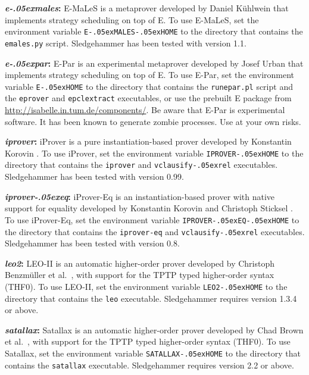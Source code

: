 \documentclass[a4paper,12pt]{article}
\newcommand\download{\url{http://isabelle.in.tum.de/components/}}
\renewcommand\_{\hbox{\textunderscore\kern-.05ex}}
\begin{document}
\begin{enum}
\begin{sloppy}
\begin{enum}
\item[\labelitemi] \textbf{\textit{e\_males}:} E-MaLeS is a metaprover developed
by Daniel K\"uhlwein that implements strategy scheduling on top of E. To use
E-MaLeS, set the environment variable \texttt{E\_MALES\_HOME} to the directory
that contains the \texttt{emales.py} script. Sledgehammer has been tested with
version 1.1.

\item[\labelitemi] \textbf{\textit{e\_par}:} E-Par is an experimental metaprover
developed by Josef Urban that implements strategy scheduling on top of E. To use
E-Par, set the environment variable \texttt{E\_HOME} to the directory that
contains the \texttt{runepar.pl} script and the \texttt{eprover} and
\texttt{epclextract} executables, or use the prebuilt E package from \download.
Be aware that E-Par is experimental software. It has been known to generate
zombie processes. Use at your own risks.

\item[\labelitemi] \textbf{\textit{iprover}:} iProver is a pure
instantiation-based prover developed by Konstantin Korovin \cite{korovin-2009}.
To use iProver, set the environment variable \texttt{IPROVER\_HOME} to the
directory that contains the \texttt{iprover} and \texttt{vclausify\_rel}
executables. Sledgehammer has been tested with version 0.99.

\item[\labelitemi] \textbf{\textit{iprover\_eq}:} iProver-Eq is an
instantiation-based prover with native support for equality developed by
Konstantin Korovin and Christoph Sticksel \cite{korovin-sticksel-2010}. To use
iProver-Eq, set the environment variable \texttt{IPROVER\_EQ\_HOME} to the
directory that contains the \texttt{iprover-eq} and \texttt{vclausify\_rel}
executables. Sledgehammer has been tested with version 0.8.

\item[\labelitemi] \textbf{\textit{leo2}:} LEO-II is an automatic
higher-order prover developed by Christoph Benzm\"uller et al.\ \cite{leo2},
with support for the TPTP typed higher-order syntax (THF0). To use LEO-II, set
the environment variable \texttt{LEO2\_HOME} to the directory that contains the
\texttt{leo} executable. Sledgehammer requires version 1.3.4 or above.

\item[\labelitemi] \textbf{\textit{satallax}:} Satallax is an automatic
higher-order prover developed by Chad Brown et al.\ \cite{satallax}, with
support for the TPTP typed higher-order syntax (THF0). To use Satallax, set the
environment variable \texttt{SATALLAX\_HOME} to the directory that contains the
\texttt{satallax} executable. Sledgehammer requires version 2.2 or above.


\end{enum}
\end{sloppy}
\end{enum}
\end{document}
